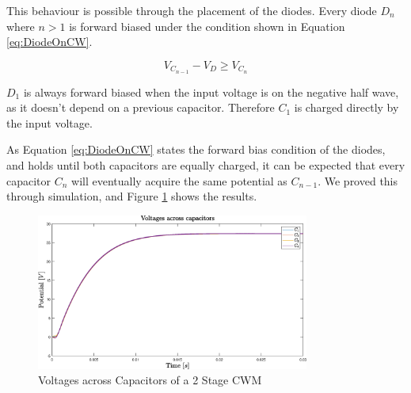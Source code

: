 This behaviour is possible through the placement of the diodes.
Every diode $D_n$ where $n > 1$ is forward biased under the condition shown in Equation \ref{eq:DiodeOnCW}.

\begin{equation}
	V_{C_{n-1}}-V_D \geq V_{C_n}
	\label{eq:DiodeOnCW}
\end{equation}

$D_1$ is always forward biased when the input voltage is on the negative half wave,
as it doesn't depend on a previous capacitor.
Therefore $C_1$ is charged directly by the input voltage.

As Equation \ref{eq:DiodeOnCW} states the forward bias condition of the diodes,
and holds until both capacitors are equally charged,
it can be expected that every capacitor $C_n$ will eventually acquire the same potential as $C_{n-1}$.
We proved this through simulation,
and Figure \ref{fig:capsV} shows the results.


\begin{figure}[H]
   \centering
   \includegraphics[width=0.8\textwidth]{figures/xCockroftWalton/capsV.eps}
    \caption{Voltages across Capacitors of a 2 Stage CWM}
	\label{fig:capsV}
\end{figure}
